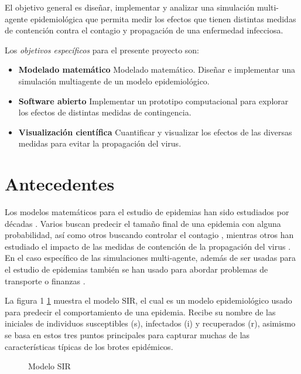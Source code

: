 \documentclass[a4]{sciposter}
\begin{document}
\begin{multicols}{2}
El objetivo general es diseñar, implementar y analizar una simulación multi-agente epidemiológica que permita medir los efectos que tienen distintas medidas de contención contra el contagio y propagación de una enfermedad infecciosa.\par
Los \emph{objetivos específicos} para el presente proyecto son:\par
\begin{itemize}
  \item \textbf{Modelado matemático} Modelado matemático. Diseñar e implementar una simulación multiagente de un modelo epidemiológico.
  \item \textbf{Software abierto} Implementar un prototipo computacional para explorar los efectos de distintas medidas de contingencia.
  \item \textbf{Visualización científica} Cuantificar y visualizar los efectos de las diversas medidas para evitar la propagación del virus.
\end{itemize}

\section{Antecedentes}
Los modelos matemáticos para el estudio de epidemias han sido estudiados por décadas \cite{decadas}. Varios buscan predecir el tamaño final de una epidemia con alguna probabilidad, así como otros buscando controlar el contagio \cite{contagio}, mientras otros han estudiado el impacto de las medidas de contención de la propagación del virus \cite{virus}. En el caso específico de las simulaciones multi-agente, además de ser usadas para el estudio de epidemias \cite{epidemias} también se han usado para abordar problemas de transporte \cite{transporte} o finanzas \cite{finanzas}.

La figura 1 \ref{diag} muestra el modelo SIR, el cual es un modelo epidemiológico usado para predecir el comportamiento de una epidemia. Recibe su nombre de las iniciales de individuos susceptibles (s), infectados (i) y recuperados (r), asimismo se basa en estos tres puntos principales para capturar muchas de las características típicas de los brotes epidémicos.

\begin{figure}
\captionsetup{type=figure}
\setcounter{figure}{0}
\begin{center}
\end{center}
\caption{Modelo SIR}
\label{diag}
\end{figure}


\end{multicols}
\end{document}
